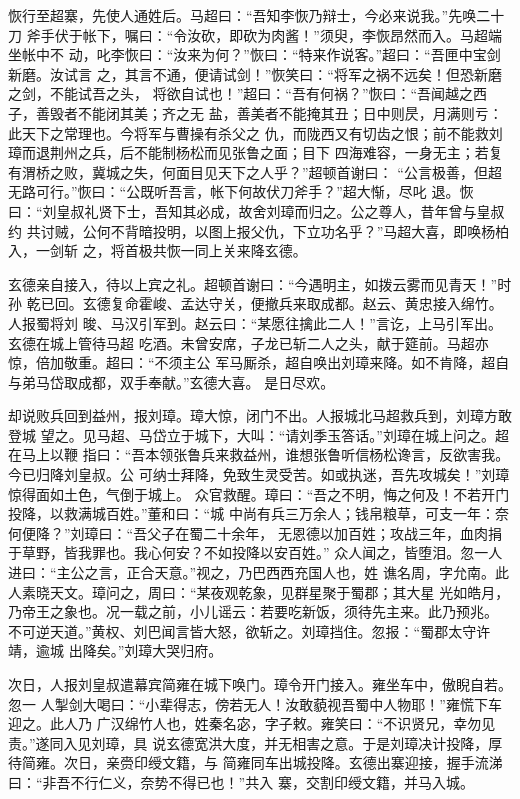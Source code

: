 恢行至超寨，先使人通姓后。马超曰：“吾知李恢乃辩士，今必来说我。”先唤二十刀
斧手伏于帐下，嘱曰：“令汝砍，即砍为肉酱！”须臾，李恢昂然而入。马超端坐帐中不
动，叱李恢曰：“汝来为何？”恢曰：“特来作说客。”超曰：“吾匣中宝剑新磨。汝试言
之，其言不通，便请试剑！”恢笑曰：“将军之祸不远矣！但恐新磨之剑，不能试吾之头，
将欲自试也！”超曰：“吾有何祸？”恢曰：“吾闻越之西子，善毁者不能闭其美；齐之无
盐，善美者不能掩其丑；日中则昃，月满则亏：此天下之常理也。今将军与曹操有杀父之
仇，而陇西又有切齿之恨；前不能救刘璋而退荆州之兵，后不能制杨松而见张鲁之面；目下
四海难容，一身无主；若复有渭桥之败，冀城之失，何面目见天下之人乎？”超顿首谢曰：
“公言极善，但超无路可行。”恢曰：“公既听吾言，帐下何故伏刀斧手？”超大惭，尽叱
退。恢曰：“刘皇叔礼贤下士，吾知其必成，故舍刘璋而归之。公之尊人，昔年曾与皇叔约
共讨贼，公何不背暗投明，以图上报父仇，下立功名乎？”马超大喜，即唤杨柏入，一剑斩
之，将首极共恢一同上关来降玄德。

玄德亲自接入，待以上宾之礼。超顿首谢曰：“今遇明主，如拨云雾而见青天！”时孙
乾已回。玄德复命霍峻、孟达守关，便撤兵来取成都。赵云、黄忠接入绵竹。人报蜀将刘
晙、马汉引军到。赵云曰：“某愿往擒此二人！”言讫，上马引军出。玄德在城上管待马超
吃酒。未曾安席，子龙已斩二人之头，献于筵前。马超亦惊，倍加敬重。超曰：“不须主公
军马厮杀，超自唤出刘璋来降。如不肯降，超自与弟马岱取成都，双手奉献。”玄德大喜。
是日尽欢。

却说败兵回到益州，报刘璋。璋大惊，闭门不出。人报城北马超救兵到，刘璋方敢登城
望之。见马超、马岱立于城下，大叫：“请刘季玉答话。”刘璋在城上问之。超在马上以鞭
指曰：“吾本领张鲁兵来救益州，谁想张鲁听信杨松谗言，反欲害我。今已归降刘皇叔。公
可纳士拜降，免致生灵受苦。如或执迷，吾先攻城矣！”刘璋惊得面如土色，气倒于城上。
众官救醒。璋曰：“吾之不明，悔之何及！不若开门投降，以救满城百姓。”董和曰：“城
中尚有兵三万余人；钱帛粮草，可支一年：奈何便降？”刘璋曰：“吾父子在蜀二十余年，
无恩德以加百姓；攻战三年，血肉捐于草野，皆我罪也。我心何安？不如投降以安百姓。”
众人闻之，皆堕泪。忽一人进曰：“主公之言，正合天意。”视之，乃巴西西充国人也，姓
谯名周，字允南。此人素晓天文。璋问之，周曰：“某夜观乾象，见群星聚于蜀郡；其大星
光如皓月，乃帝王之象也。况一载之前，小儿谣云：若要吃新饭，须待先主来。此乃预兆。
不可逆天道。”黄权、刘巴闻言皆大怒，欲斩之。刘璋挡住。忽报：“蜀郡太守许靖，逾城
出降矣。”刘璋大哭归府。

次日，人报刘皇叔遣幕宾简雍在城下唤门。璋令开门接入。雍坐车中，傲睨自若。忽一
人掣剑大喝曰：“小辈得志，傍若无人！汝敢藐视吾蜀中人物耶！”雍慌下车迎之。此人乃
广汉绵竹人也，姓秦名宓，字子敕。雍笑曰：“不识贤兄，幸勿见责。”遂同入见刘璋，具
说玄德宽洪大度，并无相害之意。于是刘璋决计投降，厚待简雍。次日，亲赍印绶文籍，与
简雍同车出城投降。玄德出寨迎接，握手流涕曰：“非吾不行仁义，奈势不得已也！”共入
寨，交割印绶文籍，并马入城。

